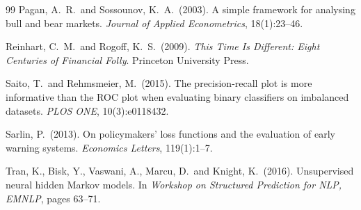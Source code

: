 \documentclass[11pt,a4paper]{article}
\begin{document}
\begin{thebibliography}{99}
Pagan, A.\ R.\ and Sossounov, K.\ A.\ (2003). A simple framework for analysing
bull and bear markets. \emph{Journal of Applied Econometrics}, 18(1):23--46.

Reinhart, C.\ M.\ and Rogoff, K.\ S.\ (2009). \emph{This Time Is Different:
Eight Centuries of Financial Folly}. Princeton University Press.

Saito, T.\ and Rehmsmeier, M.\ (2015). The precision-recall plot is more
informative than the ROC plot when evaluating binary classifiers on imbalanced
datasets. \emph{PLOS ONE}, 10(3):e0118432.

Sarlin, P.\ (2013). On policymakers' loss functions and the evaluation of early
warning systems. \emph{Economics Letters}, 119(1):1--7.

Tran, K., Bisk, Y., Vaswani, A., Marcu, D.\ and Knight, K.\ (2016).
Unsupervised neural hidden Markov models. In \emph{Workshop on Structured
Prediction for NLP, EMNLP}, pages 63--71.

\end{thebibliography}
\end{document}
